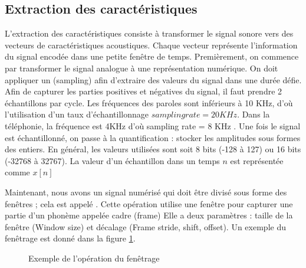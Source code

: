 \documentclass{KodeBook}
\begin{document}
\subsection{Extraction des caractéristiques}

L'extraction des caractéristiques consiste à transformer le signal sonore vers des vecteurs de caractéristiques acoustiques.
Chaque vecteur représente l'information du signal encodée dans une petite fenêtre de temps.
Premièrement, on commence par transformer le signal analogue à une représentation numérique.
On doit appliquer un  (sampling) afin d'extraire des valeurs du signal dans une durée défie. 
Afin de capturer les parties positives et négatives du signal, il faut prendre 2 échantillons par cycle.
Les fréquences des paroles sont inférieurs à 10 KHz, d'où l'utilisation d'un taux d'échantillonnage $ sampling rate = 20 KHz $. 
Dans la téléphonie, la fréquence est 4KHz d'où sampling rate = 8 KHz \cite{2019-jurafsky-martin}. 
Une fois le signal est échantillonné, on passe à la quantification : stocker les amplitudes sous formes des entiers.
En général, les valeurs utilisées sont soit 8 bits (-128 à 127) ou 16 bits (-32768 à 32767).
La valeur d'un échantillon dans un temps $n$ est représentée comme $x[n]$

Maintenant, nous avons un signal numérisé qui doit être divisé sous forme des fenêtres ; cela est appelé .
Cette opération utilise une fenêtre pour capturer une partie d'un phonème appelée cadre (frame)
Elle a deux paramètres : taille de la fenêtre (Window size) et décalage (Frame stride, shift, offset).
Un exemple du fenêtrage est donné dans la figure \ref{asr-windowing-exp}.
\begin{figure}[!ht]
	\centering
	\caption{Exemple de l'opération du fenêtrage \cite{2020-jurafsky-martin}}
	\label{asr-windowing-exp}
\end{figure}
\end{document}
